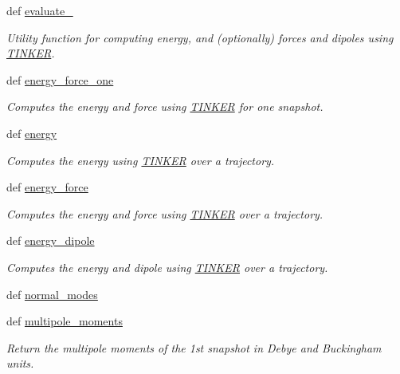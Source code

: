 \begin{DoxyCompactItemize}
def \hyperlink{classforcebalance_1_1tinkerio_1_1TINKER_a26caae60b8feb93fbb810e0f51ea2238}{evaluate\-\_\-}
\begin{DoxyCompactList}\small\item\em Utility function for computing energy, and (optionally) forces and dipoles using \hyperlink{classforcebalance_1_1tinkerio_1_1TINKER}{T\-I\-N\-K\-E\-R}. \end{DoxyCompactList}\item 
def \hyperlink{classforcebalance_1_1tinkerio_1_1TINKER_a78f330c7a2cd41402fa742010073016f}{energy\-\_\-force\-\_\-one}
\begin{DoxyCompactList}\small\item\em Computes the energy and force using \hyperlink{classforcebalance_1_1tinkerio_1_1TINKER}{T\-I\-N\-K\-E\-R} for one snapshot. \end{DoxyCompactList}\item 
def \hyperlink{classforcebalance_1_1tinkerio_1_1TINKER_abd62dc7b18f9a1601b9bcb9b2738b616}{energy}
\begin{DoxyCompactList}\small\item\em Computes the energy using \hyperlink{classforcebalance_1_1tinkerio_1_1TINKER}{T\-I\-N\-K\-E\-R} over a trajectory. \end{DoxyCompactList}\item 
def \hyperlink{classforcebalance_1_1tinkerio_1_1TINKER_a9da41177664b07fa14fa934224b325a7}{energy\-\_\-force}
\begin{DoxyCompactList}\small\item\em Computes the energy and force using \hyperlink{classforcebalance_1_1tinkerio_1_1TINKER}{T\-I\-N\-K\-E\-R} over a trajectory. \end{DoxyCompactList}\item 
def \hyperlink{classforcebalance_1_1tinkerio_1_1TINKER_a61a4a69208f080876818e02a422f2706}{energy\-\_\-dipole}
\begin{DoxyCompactList}\small\item\em Computes the energy and dipole using \hyperlink{classforcebalance_1_1tinkerio_1_1TINKER}{T\-I\-N\-K\-E\-R} over a trajectory. \end{DoxyCompactList}\item 
def \hyperlink{classforcebalance_1_1tinkerio_1_1TINKER_a2e5df995bf9fbc58354b117964860cab}{normal\-\_\-modes}
\item 
def \hyperlink{classforcebalance_1_1tinkerio_1_1TINKER_ae45c6b635bb487f63dcef3fee375ae74}{multipole\-\_\-moments}
\begin{DoxyCompactList}\small\item\em Return the multipole moments of the 1st snapshot in Debye and Buckingham units. \end{DoxyCompactList}\item 

\end{DoxyCompactItemize}

